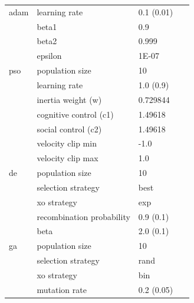 \begin{table}[htbp]
{\begin{tabular}{llll}
                  adam               & learning rate             & 0.1 (0.01)     & ~\cite{ref:kingma:2014}    \\
                                     & beta1                     & 0.9            &                            \\
                                     & beta2                     & 0.999          &                            \\
                                     & epsilon                   & 1E-07          &                            \\
                  pso                & population size           & 10             & ~\cite{ref:van:2010}       \\
                                     & learning rate             & 1.0 (0.9)      &                            \\
                                     & inertia weight (w)        & 0.729844       &                            \\
                                     & cognitive control (c1)    & 1.49618        &                            \\
                                     & social control (c2)       & 1.49618        &                            \\
                                     & velocity clip min         & -1.0           &                            \\
                                     & velocity clip max         & 1.0            &                            \\
                  de                 & population size           & 10             & ~\cite{ref:mezura:2006}    \\
                                     & selection strategy        & best           &                            \\
                                     & xo strategy               & exp            &                            \\
                                     & recombination probability & 0.9 (0.1)      &                            \\
                                     & beta                      & 2.0 (0.1)      &                            \\
                  ga                 & population size           & 10             & ~\cite{ref:lambora:2019}   \\
                                     & selection strategy        & rand           &                            \\
                                     & xo strategy               & bin            &                            \\
                                     & mutation rate             & 0.2 (0.05)     &                            \\
            \end{tabular}%
      }
\end{table}%

